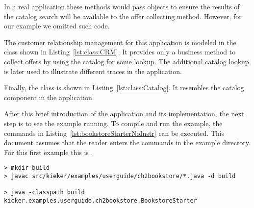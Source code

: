 In a real application these methods would pass objects to ensure the results of the catalog search will be available to the offer collecting method. However, for our example we omitted such code.



\noindent The customer relationship management for this application is modeled in the  class shown in Listing~\ref{lst:class:CRM}. It provides only a business method to collect offers by using the catalog for some lookup. The additional catalog lookup is later used to illustrate different traces in the application.




\enlargethispage{0.8cm}

\noindent Finally, the class  is shown in Listing~\ref{lst:class:Catalog}. It resembles the catalog component in the application.



\noindent After this brief introduction of the application and its implementation, the next step is to see the example running. To compile and run the example, the commands in Listing~\ref{lst:bookstoreStarterNoInstr} can be executed. This document assumes that the reader enters the commands in the example directory. For this first example this is .
\\

\setBashListing
% 
\begin{lstlisting}[label=lst:bookstoreStarterNoInstr, caption=Commands to compile and run the Bookstore application]
> mkdir build
> javac src/kieker/examples/userguide/ch2bookstore/*.java -d build

> java -classpath build kicker.examples.userguide.ch2bookstore.BookstoreStarter
\end{lstlisting}

